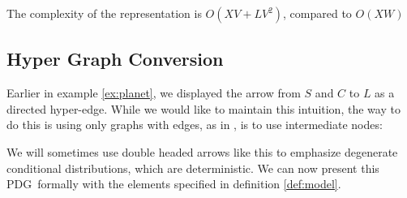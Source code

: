 \documentclass{article}
\newcommand{\MN}{PDG}
\numberwithin{equation}{section}
\begin{document}
\begin{notfocus}
	
	The complexity of the representation is $O(XV + L V^2)$, compared to $O(XW)$
	
	\subsection{Hyper Graph Conversion}\label{sec:hyper-convert}
	\begin{example}[continues=ex:planet]
		Earlier in example \ref{ex:planet}, we displayed the arrow from $S$ and $C$ to $L$ as a directed hyper-edge. While we would like to maintain this intuition, the way to do this is using only graphs with edges, as in , is to use intermediate nodes:
		
		\begin{center}
		\end{center}
		We will sometimes use double headed arrows like this to emphasize degenerate conditional distributions, which are deterministic.
		We can now present this \MN\ formally with the elements specified in definition \ref{def:model}.
		

\end{example}
\end{notfocus}
\end{document}
